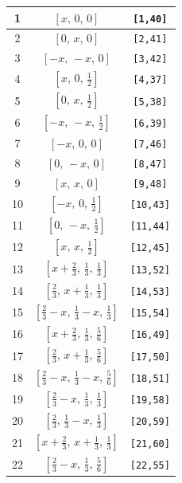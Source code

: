 \documentclass[fleqn,8pt]{jsarticle}
\begin{document}
\begin{longtable}{ccc}
1 & $\left[ x,\, 0,\, 0 \right]$ & {\tt [1,40]} \\ \hline
2 & $\left[ 0,\, x,\, 0 \right]$ & {\tt [2,41]} \\ \hline
3 & $\left[ - x,\, - x,\, 0 \right]$ & {\tt [3,42]} \\ \hline
4 & $\left[ x,\, 0,\, \frac{1}{2} \right]$ & {\tt [4,37]} \\ \hline
5 & $\left[ 0,\, x,\, \frac{1}{2} \right]$ & {\tt [5,38]} \\ \hline
6 & $\left[ - x,\, - x,\, \frac{1}{2} \right]$ & {\tt [6,39]} \\ \hline
7 & $\left[ - x,\, 0,\, 0 \right]$ & {\tt [7,46]} \\ \hline
8 & $\left[ 0,\, - x,\, 0 \right]$ & {\tt [8,47]} \\ \hline
9 & $\left[ x,\, x,\, 0 \right]$ & {\tt [9,48]} \\ \hline
10 & $\left[ - x,\, 0,\, \frac{1}{2} \right]$ & {\tt [10,43]} \\ \hline
11 & $\left[ 0,\, - x,\, \frac{1}{2} \right]$ & {\tt [11,44]} \\ \hline
12 & $\left[ x,\, x,\, \frac{1}{2} \right]$ & {\tt [12,45]} \\ \hline
13 & $\left[ x + \frac{2}{3},\, \frac{1}{3},\, \frac{1}{3} \right]$ & {\tt [13,52]} \\ \hline
14 & $\left[ \frac{2}{3},\, x + \frac{1}{3},\, \frac{1}{3} \right]$ & {\tt [14,53]} \\ \hline
15 & $\left[ \frac{2}{3} - x,\, \frac{1}{3} - x,\, \frac{1}{3} \right]$ & {\tt [15,54]} \\ \hline
16 & $\left[ x + \frac{2}{3},\, \frac{1}{3},\, \frac{5}{6} \right]$ & {\tt [16,49]} \\ \hline
17 & $\left[ \frac{2}{3},\, x + \frac{1}{3},\, \frac{5}{6} \right]$ & {\tt [17,50]} \\ \hline
18 & $\left[ \frac{2}{3} - x,\, \frac{1}{3} - x,\, \frac{5}{6} \right]$ & {\tt [18,51]} \\ \hline
19 & $\left[ \frac{2}{3} - x,\, \frac{1}{3},\, \frac{1}{3} \right]$ & {\tt [19,58]} \\ \hline
20 & $\left[ \frac{2}{3},\, \frac{1}{3} - x,\, \frac{1}{3} \right]$ & {\tt [20,59]} \\ \hline
21 & $\left[ x + \frac{2}{3},\, x + \frac{1}{3},\, \frac{1}{3} \right]$ & {\tt [21,60]} \\ \hline
22 & $\left[ \frac{2}{3} - x,\, \frac{1}{3},\, \frac{5}{6} \right]$ & {\tt [22,55]} \\ \hline

\end{longtable}
\end{document}
